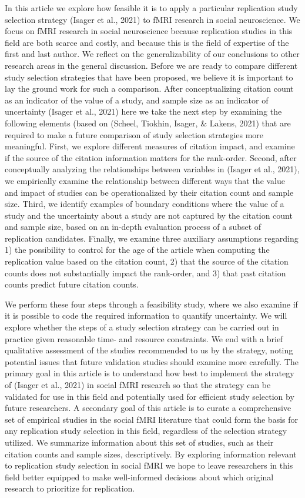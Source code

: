 \documentclass[
  man,floatsintext]{apa6}
\begin{document}
In this article we explore how feasible it is to apply a particular replication study selection strategy (Isager et al., 2021) to fMRI research in social neuroscience. We focus on fMRI research in social neuroscience because replication studies in this field are both scarce and costly, and because this is the field of expertise of the first and last author. We reflect on the generalizability of our conclusions to other research areas in the general discussion. Before we are ready to compare different study selection strategies that have been proposed, we believe it is important to lay the ground work for such a comparison. After conceptualizing citation count as an indicator of the value of a study, and sample size as an indicator of uncertainty (Isager et al., 2021) here we take the next step by examining the following elements (based on (Scheel, Tiokhin, Isager, \& Lakens, 2021) that are required to make a future comparison of study selection strategies more meaningful. First, we explore different measures of citation impact, and examine if the source of the citation information matters for the rank-order. Second, after conceptually analyzing the relationships between variables in (Isager et al., 2021), we empirically examine the relationship between different ways that the value and impact of studies can be operationalized by their citation count and sample size. Third, we identify examples of boundary conditions where the value of a study and the uncertainty about a study are not captured by the citation count and sample size, based on an in-depth evaluation process of a subset of replication candidates. Finally, we examine three auxiliary assumptions regarding 1) the possibility to control for the age of the article when computing the replication value based on the citation count, 2) that the source of the citation counts does not substantially impact the rank-order, and 3) that past citation counts predict future citation counts.

We perform these four steps through a feasibility study, where we also examine if it is possible to code the required information to quantify uncertainty. We will explore whether the steps of a study selection strategy can be carried out in practice given reasonable time- and resource constraints. We end with a brief qualitative assessment of the studies recommended to us by the strategy, noting potential issues that future validation studies should examine more carefully. The primary goal in this article is to understand how best to implement the strategy of (Isager et al., 2021) in social fMRI research so that the strategy can be validated for use in this field and potentially used for efficient study selection by future researchers. A secondary goal of this article is to curate a comprehensive set of empirical studies in the social fMRI literature that could form the basis for any replication study selection in this field, regardless of the selection strategy utilized. We summarize information about this set of studies, such as their citation counts and sample sizes, descriptively. By exploring information relevant to replication study selection in social fMRI we hope to leave researchers in this field better equipped to make well-informed decisions about which original research to prioritize for replication.
\end{document}
